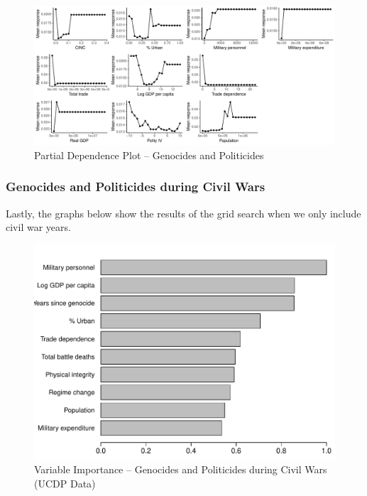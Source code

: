 \documentclass[a4paper,12pt]{article}
\begin{document}
\newpage

\begin{figure}[H]
    \centering
    \includegraphics[width=.98\textheight,angle=90]{images/rf-uamk-pd.pdf}
    \caption{Partial Dependence Plot -- Genocides and Politicides}
    \label{fig:rf-mk-4363}
\end{figure}

\newpage

\subsubsection{Genocides and Politicides during Civil Wars}

Lastly, the graphs below show the results of the grid search when we only include civil war years. 

\begin{figure}[H]
    \centering
    \includegraphics{images/rf-uamk-ucdp.pdf}
    \caption{Variable Importance -- Genocides and Politicides during Civil Wars (UCDP Data)}
    \label{fig:rf-mk-ucdp}
\end{figure}
\end{document}
